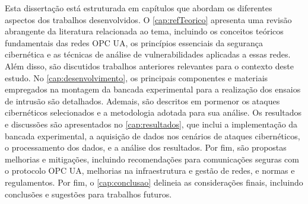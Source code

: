     Esta dissertação está estruturada em capítulos que abordam os diferentes aspectos dos trabalhos desenvolvidos. O \autoref{cap:refTeorico} apresenta uma revisão abrangente da literatura relacionada ao tema, incluindo os conceitos teóricos fundamentais das redes OPC UA, os princípios essenciais da segurança cibernética e as técnicas de análise de vulnerabilidades aplicadas a essas redes. Além disso, são discutidos trabalhos anteriores relevantes para o contexto deste estudo. No \autoref{cap:desenvolvimento}, os principais componentes e materiais empregados na montagem da bancada experimental para a realização dos ensaios de intrusão são detalhados. Ademais, são descritos em pormenor os ataques cibernéticos selecionados e a metodologia adotada para sua análise. Os resultados e discussões são apresentados no \autoref{cap:resultados}, que inclui a implementação da bancada experimental, a aquisição de dados nos cenários de ataques cibernéticos, o processamento dos dados, e a análise dos resultados. Por fim, são propostas melhorias e mitigações, incluindo recomendações para comunicações seguras com o protocolo OPC UA, melhorias na infraestrutura e gestão de redes, e normas e regulamentos. Por fim, o \autoref{cap:conclusao} delineia as considerações finais, incluindo conclusões e sugestões para trabalhos futuros.